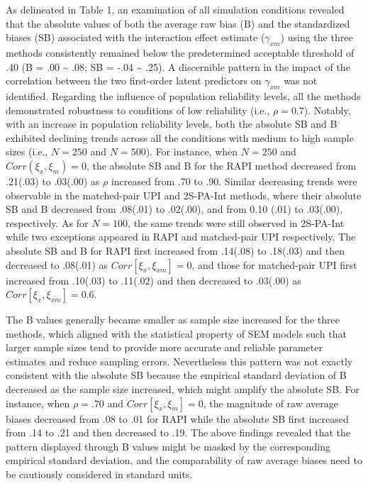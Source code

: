 \documentclass[
  man]{apa6}
\begin{document}
As delineated in Table 1, an examination of all simulation conditions revealed that the absolute values of both the average raw bias (B) and the standardized biases (SB) associated with the interaction effect estimate (\(\gamma_{xm}\)) using the three methods consistently remained below the predetermined acceptable threshold of .40 (B = .00 \textasciitilde{} .08; SB = -.04 \textasciitilde{} .25). A discernible pattern in the impact of the correlation between the two first-order latent predictors on \(\gamma_{xm}\) was not identified. Regarding the influence of population reliability levels, all the methods demonstrated robustness to conditions of low reliability (i.e., \(\rho = 0.7\)). Notably, with an increase in population reliability levels, both the absolute SB and B exhibited declining trends across all the conditions with medium to high sample sizes (i.e., \(\textit{N} = 250\) and \(\textit{N} = 500\)). For instance, when \(\textit{N} = 250\) and \(Corr(\xi_{x}, \xi_{m}) = 0\), the absolute SB and B for the RAPI method decreased from .21(.03) to .03(.00) as \(\rho\) increased from .70 to .90. Similar decreasing trends were observable in the matched-pair UPI and 2S-PA-Int methods, where their absolute SB and B decreased from .08(.01) to .02(.00), and from 0.10 (.01) to .03(.00), respectively. As for \(\textit{N} = 100\), the same trends were still observed in 2S-PA-Int while two exceptions appeared in RAPI and matched-pair UPI respectively. The absolute SB and B for RAPI first increased from .14(.08) to .18(.03) and then decreased to .08(.01) as \(Corr[\xi_{x}, \xi_{xm}] = 0\), and those for matched-pair UPI first increased from .10(.03) to .11(.02) and then decreased to .03(.00) as \(Corr[\xi_{x}, \xi_{xm}] = 0.6\).

The B values generally became smaller as sample size increased for the three methods, which aligned with the statistical property of SEM models such that larger sample sizes tend to provide more accurate and reliable parameter estimates and reduce sampling errors. Nevertheless this pattern was not exactly consistent with the absolute SB because the empirical standard deviation of B decreased as the sample size increased, which might amplify the absolute SB. For instance, when \(\rho = .70\) and \(Corr[\xi_{x}, \xi_{m}] = 0\), the magnitude of raw average biases decreased from .08 to .01 for RAPI while the absolute SB first increased from .14 to .21 and then decreased to .19. The above findings revealed that the pattern displayed through B values might be masked by the corresponding empirical standard deviation, and the comparability of raw average biases need to be cautiously considered in standard units.
\end{document}

